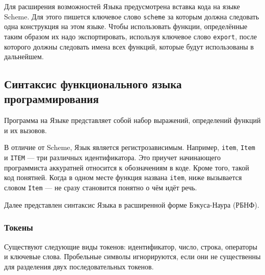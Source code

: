         

        Для расширения возможностей Языка предусмотрена вставка кода на языке Scheme.
        Для этого пишется ключевое слово \verb$scheme$ за которым должна следовать одна конструкция на этом языке.
        Чтобы использовать функции, определённые таким образом их надо экспортировать, используя ключевое слово \verb$export$, после которого должны следовать имена всех функций, которые будут использованы в дальнейшем.

    \subsection{Синтаксис функционального языка программирования}
        Программа на Языке представляет собой набор выражений, определений функций и их вызовов.
        
        В отличие от Scheme, Язык является регистрозависимым.
        Например, \verb$item$, \verb$Item$ и \verb$ITEM$ --- три различных идентификатора.
        Это приучет начинающего программиста аккуратней относится к обозначениям в коде.
        Кроме того, такой код понятней.
        Когда в одном месте функция названа \verb$item$, ниже вызывается словом \verb$Item$ --- не сразу становится понятно о чём идёт речь.

        Далее представлен синтаксис Языка в расширенной форме Бэкуса-Наура (РБНФ)\cite{skor}.

        \subsubsection{Токены}
            Существуют следующие виды токенов: идентификатор, число, строка, операторы и ключевые слова.
            Пробельные символы игнорируются, если они не существенны для разделения двух последовательных токенов.

